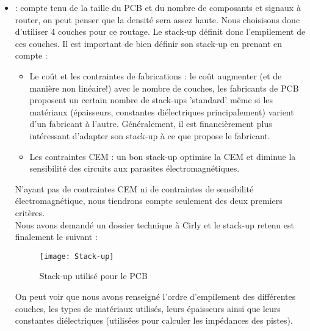 \begin{itemize}
	\item {} : compte tenu de la taille du \gls{PCB} et du nombre de composants et signaux à router, on peut penser que la densité sera assez haute.
	      Nous choisisons donc d'utiliser 4 couches pour ce routage.
	      Le stack-up définit donc l'empilement de ces couches.
	      Il est important de bien définir son stack-up en prenant en compte : 
	      \begin{itemize}
	      	\item Le coût et les contraintes de fabrications : le coût augmenter (et de manière non linéaire!) avec le nombre de couches, les fabricants de \gls{PCB} proposent un certain nombre de stack-ups 'standard' même si les matériaux (épaisseurs, constantes diélectriques principalement) varient d'un fabricant à l'autre. 
	      	      Généralement, il est financièrement plus intéressant d'adapter son stack-up à ce que propose le fabricant.
	      	\item Les contraintes CEM : un bon stack-up optimise la CEM et diminue la sensibilité des circuits aux parasites électromagnétiques.
	      \end{itemize}
	      N'ayant pas de contraintes CEM ni de contraintes de sensibilité électromagnétique, nous tiendrons compte seulement des deux premiers critères. \\
	      Nous avons demandé un dossier technique à Cirly et le stack-up retenu est finalement le suivant :
	          
	      \begin{figure}[H]
	      	\begin{center}
	      		\texttt{[image: Stack-up]}
	      	\end{center}
	      	\caption{Stack-up utilisé pour le PCB}
	      \end{figure}
	                
	      On peut voir que nous avons renseigné l'ordre d'empilement des différentes couches, les types de matériaux utilisés, leurs épaisseurs ainsi que leurs constantes diélectriques (utilisées pour calculer les impédances des pistes). 
	      	

\end{itemize}
